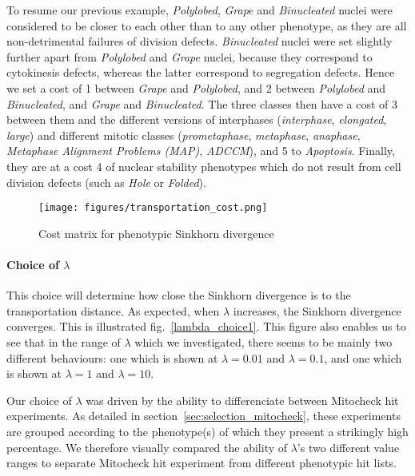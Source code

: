 To resume our previous example, \textit{Polylobed}, \textit{Grape} and
\textit{Binucleated} nuclei were considered to be closer to each other
than to any other phenotype, as they are all non-detrimental failures
of division defects. \textit{Binucleated} nuclei were set slightly
further apart from \textit{Polylobed} and \textit{Grape} nuclei,
because they correspond to cytokinesis defects, whereas the latter
correspond to segregation defects. 
Hence we set a cost of 1 between \textit{Grape} and
\textit{Polylobed}, and 2 between \textit{Polylobed} and
\textit{Binucleated}, and \textit{Grape} and \textit{Binucleated}. The
three classes then have a cost of 3 between them and the different
versions of interphases (\textit{interphase}, \textit{elongated},
\textit{large}) and different mitotic classes (\textit{prometaphase},
\textit{metaphase}, \textit{anaphase}, \textit{Metaphase Alignment
  Problems (MAP)}, \textit{ADCCM}), and 5 to \textit{Apoptosis}. Finally, they are at a
cost 4 of nuclear stability phenotypes which do not result from cell division
defects (such as \textit{Hole} or \textit{Folded}). 


\begin{figure*}[ht!]
\centerline{\texttt{[image: figures/transportation\_cost.png]}
}
\caption{Cost matrix for phenotypic Sinkhorn divergence}
\label{cost}
\end{figure*}

\paragraph{Choice of $\lambda$} This choice will determine how close the Sinkhorn divergence is to the transportation distance. As expected, when $\lambda$ increases, the Sinkhorn divergence converges. This is illustrated fig.~\ref{lambda_choice1}. This figure also enables us to see that in the range of $\lambda$ which we investigated, there seems to be mainly two different behaviours: one which is shown at $\lambda=0.01$ and $\lambda=0.1$, and one which is shown at $\lambda=1$ and $\lambda=10$.

Our choice of $\lambda$ was driven by the ability to differenciate between Mitocheck hit experiments. As detailed in section~\ref{sec:selection_mitocheck}, these experiments are grouped according to the phenotype(s) of which they present a strikingly high percentage. We therefore visually compared the ability of $\lambda$'s two different value ranges to separate Mitocheck hit experiment from different phenotypic hit lists. 

